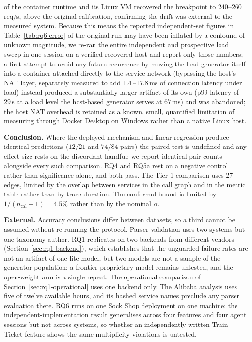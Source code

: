 \documentclass[journal, 10pt]{IEEEtran}
\begin{document}
of the container runtime and its Linux VM recovered the breakpoint to
$240$--$260\,$req/s, above the original calibration, confirming the drift was
external to the measured system. Because this means the reported independent-set
figures in Table~\ref{tab:rq6-error} of the original run may have been inflated
by a confound of unknown magnitude, we re-ran the entire independent and
prospective load sweep in one session on a verified-recovered host and report
only those numbers; a first attempt to avoid any future recurrence by moving the
load generator itself into a container attached directly to the service
network (bypassing the host's NAT layer, separately measured to add
$1.4\,$--$17.8\,$ms of connection latency under load) instead produced a
substantially larger artifact of its own (p99 latency of $29\,$s at a load
level the host-based generator serves at $67\,$ms) and was abandoned; the host
NAT overhead is retained as a known, small, quantified limitation of measuring
through Docker Desktop on Windows rather than a native Linux host.

\textbf{Conclusion.} Where the deployed mechanism and linear regression produce
identical predictions ($12/21$ and $74/84$ pairs) the paired test is undefined
and any effect size rests on the discordant handful; we report identical-pair
counts alongside every such comparison. RQ4 and RQ5a rest on a negative control
rather than significance alone, and both pass. The Tier-1 comparison uses 27
edges, limited by the overlap between services in the call graph and in the
metric table rather than by trace duration. The conformal bound is limited by
$1/(n_{\text{cal}}{+}1) = 4.5\%$ rather than by the nominal $\alpha$.

\textbf{External.} Accuracy conclusions differ between datasets, so a third
cannot be assumed without re-running the protocol. Parser validation uses two
systems but one taxonomy author. RQ1 replicates on two backends from different
vendors (Section~\ref{sec:rq1-backend}), which establishes that the unguarded
failure rates are not an artifact of one lite model, but two models are not a
sample of the generator population: a frontier proprietary model remains
untested, and the open-weight arm is a single repeat. The operational comparison
of Section~\ref{sec:rq1-operational} uses one backend only. The Alibaba
analysis uses five of twelve available hours, and its hashed service names
preclude any parser evaluation there. RQ6 runs on one Sock Shop deployment on
one machine; the independent-implementation result generalises across four
features and four agent sessions but not across systems, so whether an
independently written Train Ticket feature shows the same multiplicity
violations is untested.
\end{document}
